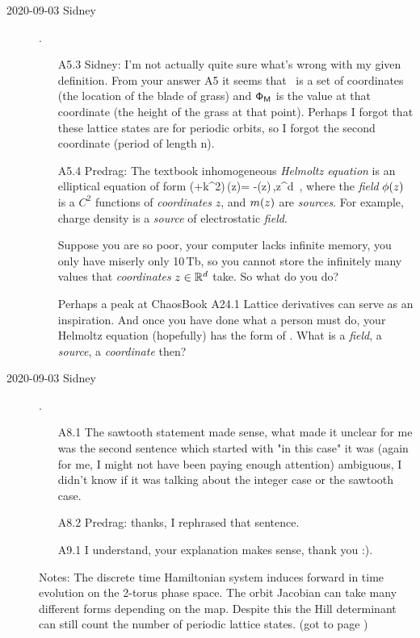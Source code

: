 \begin{description}
\item[2020-09-03 Sidney].
\begin{itemize}
	\item[A5.3] Sidney:
I'm not actually quite sure what's wrong with my given definition. From
your answer A5 it seems that \Mm\ is a set of
coordinates (the location of the blade of grass) and $\mathsf{\Phi}_{\mathsf{M}}$ is
the value at that coordinate (the height of the grass at that point).
Perhaps I forgot that these lattice states are for periodic orbits, so I
forgot the second coordinate (period of length n).
	\item[A5.4] Predrag: %
The textbook inhomogeneous \emph{Helmoltz equation} is an elliptical
equation of form
\beq
   (\Box+k^2)\,\ssp(z)= -\m(z)\,,\qquad z\in \reals^d
\,,
\label{CatMapContinuesPC}
\eeq
where the \emph{field} $\phi(z)$ is a $C^2$ functions of
\emph{coordinates} $z$, and $m(z)$ are \emph{sources}. For example,
charge density is a \emph{source} of electrostatic \emph{field}.

Suppose you are so poor, your computer lacks infinite memory, you only
have miserly only 10\,Tb, so you cannot store the infinitely many values
that \emph{coordinates} $z\in \mathbb{R}^d$ take. So what do you do?

Perhaps a peak at ChaosBook
 {A24.1
Lattice derivatives} can serve as an inspiration. And once you have done
what a person must do, your Helmoltz equation (hopefully) has the form of
.
What is a \emph{field}, a \emph{source}, a \emph{coordinate} then?
\end{itemize}


\item[2020-09-03 Sidney].
\begin{itemize}
	\item[A8.1]
The sawtooth statement made sense, what made it unclear for me was the second sentence which started with "in this case" it was (again for me, I might not have been paying enough attention) ambiguous, I didn't know if it was talking about the integer case or the sawtooth case.  	
	\item[A8.2] Predrag: thanks, I rephrased that sentence.
	\item[A9.1]
I understand, your explanation makes sense, thank you :).
\end{itemize}

\vspace{3mm}

Notes: The discrete time Hamiltonian system induces forward in time evolution on the 2-torus phase space. The orbit Jacobian can take many different forms depending on the map. Despite this the Hill determinant can still count the number of periodic lattice states.
(got to page )
\end{description}
